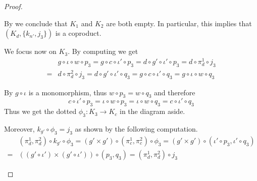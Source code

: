 \documentclass[3p]{elsarticle}
\def\E{\textbf {\textup{E}}}
\newcommand{\commentato}[1]{ {} }
\newcommand{\id}[1]{\mathsf{id}_{#1}}
\theoremstyle{remark}
\theoremstyle{definition}
\begin{document}
\begin{proof}
\begin{enumerate}
By  we conclude that $K_1$ and $K_2$
are both empty. In particular, this implies that $(K_d, \{k_{n'}, j_3\})$ is a coproduct.


We focus now on $K_3$. By computing we get
	\begin{align*}
	&g\circ \iota \circ w\circ p_3=g\circ c\circ \iota'\circ p_3=d\circ g'\circ \iota'\circ p_3=d\circ \pi^1_d\circ j_3\\=&d\circ \pi^2_d\circ j_3=d\circ g'\circ \iota' \circ q_3=g\circ c\circ \iota'\circ q_3=g\circ \iota \circ w\circ q_3
	\end{align*}

\noindent 
\parbox{3cm}{}\hfill\parbox{9.5cm}{By  $g\circ \iota$ is a monomorphism, thus $w\circ p_3=w\circ q_3$ and therefore
\[c\circ \iota'\circ p_3=\iota\circ w\circ p_3=\iota \circ w\circ q_3=c\circ \iota'\circ q_3\]
Thus we get the dotted $\phi_3\colon K_3\to K_c$ in the diagram aside.}

Moreover, $k_{g'}\circ \phi_3=j_3$ as shown by the following computation.
\begin{align*}
&(\pi^1_d, \pi^2_d)\circ k_{g'}\circ \phi_3=(g'\times g')\circ (\pi^1_c, \pi^2_c)\circ \phi_3=(g'\times g')\circ (\iota'\circ p_3, \iota'\circ q_3)\\=&((g'\circ \iota') \times (g'\circ \iota'))\circ (p_3, q_3)=(\pi^1_d, \pi^2_d)\circ j_3
\end{align*}
 
 \commentato{ 
 
 	\smallskip
 \parbox{7.5cm}{We can go further. The outer part of the diagram on the right commutes, so that we have the dotted $\psi_0\circ K_b\to K_0$.
 Now, on the one hand $\phi_0\circ \psi_0=\id{K_b}$ because if we compute we get
  \[(\pi^1_b, \pi^2_b)\circ \phi_0\circ \psi_0=(p_0, q_0)\circ \psi_0=(\pi^1_b, \pi^2_b)\]}\hfill \parbox{4cm}{\vspace{-.5cm}\xymatrix{K_b \ar[dr]_{(\pi^1_b, \pi^2_b)}  \ar@{>->}@/^.4cm/[rr]^{k_{n'}} \ar@{.>}[r]_{\psi_0}& K_0 \ar@{>->}[r]_{j_0}  \ar[d]^{(p_0, q_0)}& K_d   \ar[d]^{(\pi^1_d, \pi^2_d)} \\
 	& B'\times B' \ar@{>->}[r]_-{n'\times n'} & D'\times D' }
 	}

 On the other hand, notice that 
 \begin{align*}
 \pi^1_{d}\circ k_{n'}\circ \phi_0&=n'\circ \pi^1_b\circ \phi_0=n'\circ p_0=\pi^1_d\circ j_0 \\
 \pi^2_{d}\circ k_{n'}\circ \phi_0&=n'\circ \pi^2_b\circ \phi_0=n'\circ p_0=\pi^2_d\circ j_0
 \end{align*}

}
\end{enumerate}
\end{proof}
\end{document}
